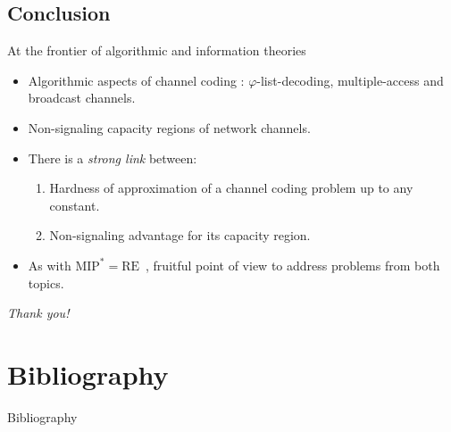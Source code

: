 \documentclass{beamer}
\theoremstyle{definition}
\theoremstyle{remark}
\begin{document}
\subsection{Conclusion}
\begin{frame}{At the frontier of algorithmic and information theories}
  \begin{itemize}
  \item Algorithmic aspects of channel coding : $\varphi$-list-decoding, multiple-access and broadcast channels.
  \item Non-signaling capacity regions of network channels.
    \pause
    \bigskip
  \item There is a \emph{strong link} between:
    \begin{enumerate}
    \item Hardness of approximation of a channel coding problem up to any constant.
    \item Non-signaling advantage for its capacity region.
    \end{enumerate}
  \item As with $\mathrm{MIP}^*=\mathrm{RE}$~\cite{JNVWY20}, fruitful point of view to address problems from both topics.
  \end{itemize}
  \pause
  \bigskip
  \begin{center}
    \huge{\emph{Thank you!}}
  \end{center}
\end{frame}

\appendix
\section{Bibliography}
\begin{frame}[allowframebreaks]{Bibliography}
  
  
\end{frame}

\end{document}
